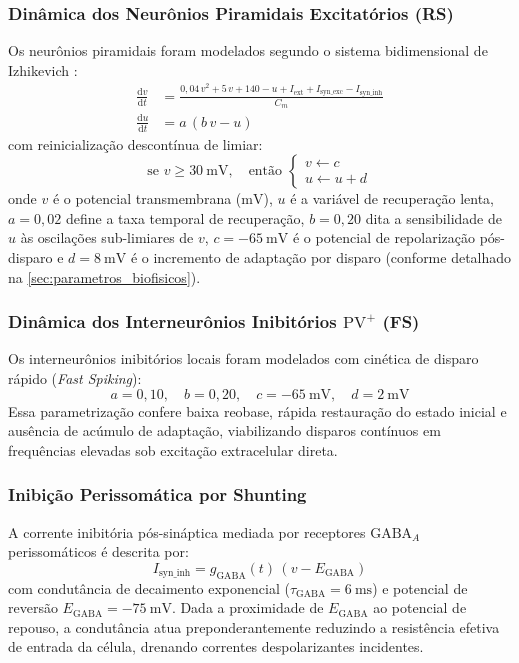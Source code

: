 \documentclass[11pt,a4paper,article,brazil]{abntex2}
\begin{document}
\subsubsection{Dinâmica dos Neurônios Piramidais Excitatórios (RS)}
Os neurônios piramidais foram modelados segundo o sistema bidimensional de Izhikevich \cite{izhikevich2003}:
\begin{align}
    \frac{\mathrm{d}v}{\mathrm{d}t} & = \frac{0{,}04\,v^2 + 5\,v + 140 - u + I_{\text{ext}} + I_{\text{syn\_exc}} - I_{\text{syn\_inh}}}{C_m} \\[0.5em]
    \frac{\mathrm{d}u}{\mathrm{d}t} & = a\,(b\,v - u)
\end{align}
com reinicialização descontínua de limiar:
\begin{equation}
    \text{se } v \ge \qty{30}{\milli\volt}, \quad \text{então } \begin{cases} v \leftarrow c \\ u \leftarrow u + d \end{cases}
\end{equation}
onde $v$ é o potencial transmembrana ($\unit{\milli\volt}$), $u$ é a variável de recuperação lenta, $a = 0{,}02$ define a taxa temporal de recuperação, $b = 0{,}20$ dita a sensibilidade de $u$ às oscilações sub-limiares de $v$, $c = \qty{-65}{\milli\volt}$ é o potencial de repolarização pós-disparo e $d = \qty{8}{\milli\volt}$ é o incremento de adaptação por disparo (conforme detalhado na \cref{sec:parametros_biofisicos}).

\subsubsection{Dinâmica dos Interneurônios Inibitórios \texorpdfstring{$\text{PV}^+$}{PV+} (FS)}
Os interneurônios inibitórios locais foram modelados com cinética de disparo rápido (\emph{Fast Spiking}):
\begin{equation}
    a = 0{,}10, \quad b = 0{,}20, \quad c = \qty{-65}{\milli\volt}, \quad d = \qty{2}{\milli\volt}
\end{equation}
Essa parametrização confere baixa reobase, rápida restauração do estado inicial e ausência de acúmulo de adaptação, viabilizando disparos contínuos em frequências elevadas sob excitação extracelular direta.

\subsubsection{Inibição Perissomática por Shunting}
A corrente inibitória pós-sináptica mediada por receptores $\text{GABA}_A$ perissomáticos é descrita por:
\begin{equation}
    I_{\text{syn\_inh}} = g_{\text{GABA}}(t)\,(v - E_{\text{GABA}})
\end{equation}
com condutância de decaimento exponencial ($\tau_{\text{GABA}} = \qty{6}{\milli\second}$) e potencial de reversão $E_{\text{GABA}} = \qty{-75}{\milli\volt}$. Dada a proximidade de $E_{\text{GABA}}$ ao potencial de repouso, a condutância atua preponderantemente reduzindo a resistência efetiva de entrada da célula, drenando correntes despolarizantes incidentes.
\end{document}
